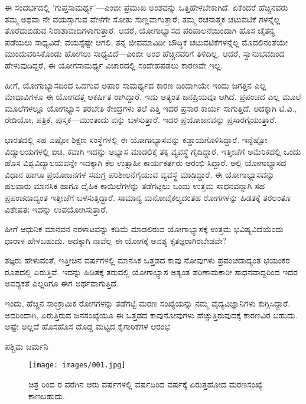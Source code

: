 ಈ ಸಂದರ್ಭದಲ್ಲಿ 'ಗುಪ್ತಸಾಮರ್ಥ್ಯ'—ಎಂಬೀ ಪ್ರಮುಖ ಅಂಶವನ್ನು ಒತ್ತಿಹೇಳಬೇಕಾಗಿದೆ. ಏಕೆಂದರೆ ಹೆಚ್ಚಿನವರು ತಮ್ಮ  ಅಥವಾ  ನೇ ವಯಸ್ಸಾಗುವ ವೇಳೆಗೇ ಸೋತು ಸುಣ್ಣವಾಗುತ್ತಾರೆ; ತಮ್ಮ ರಚನಾತ್ಮಕ ಚಟುವಟಿಕೆ ಗಳನ್ನೆಲ್ಲ ತೊರೆದುಬಿಡುವ ನಿರಾಶಾವಾದಿಗಳಾಗುತ್ತಾರೆ. ಆದರೆ, ಯೋಗಾಭ್ಯಾಸದ ಪರಿಪಾಲನೆಯಿಂದಾಗಿ ಹೊಸ ಚೈತನ್ಯ ಪಡೆಯಲು ಸಾಧ್ಯವಿದೆ; ವಯಸ್ಸೆಷ್ಟೇ ಆಗಲಿ, ತನ್ನ ಜೀವಮಾವಿಡೀ ಬೌದ್ಧಿಕ ಚಟುವಟಿಕೆಗಳನ್ನೆಲ್ಲ ಮೊದಲಿನಂತೆಯೇ ಮುಂದುವರಿಸಿಕೊಂಡು ಹೋಗಲು ಸಾಧ್ಯವಿದೆ—ಎಂಬೀ ಅಂಶ ಹೆಚ್ಚಿನವರಿಗೆ ತಿಳಿದಿಲ್ಲ. ಆದರೆ, ಸ್ವಾನುಭವದಿಂದ ಹೇಳುವುದಿದ್ದರೆ, ಈ ಯೋಗಸಾಮರ್ಥ್ಯ ವಿಚಾರದಲ್ಲಿ ಸಂದೇಹಪಡಲು ಕಾರಣವೇ ಇಲ್ಲ.

ಹೀಗೆ, ಯೋಗಾಭ್ಯಾಸದಿಂದ ಒದಗುವ ಅಪಾರ ಸಾಮರ್ಥ್ಯದ ಕಾರಣ ದಿಂದಾಗಿಯೇ ಇಂದು ಜಗತ್ತಿನ ಎಲ್ಲ ಮೇಧಾವಿಗಳೂ ಈ ಯೋಗದತ್ತ ಆಕರ್ಷಿತ ರಾಗಿದ್ದಾರೆ. ಇದು ಅತ್ಯಂತ ಜನಪ್ರಿಯವೂ ಆಗಿದೆ. ಪ್ರಪಂಚದ ಎಲ್ಲ ಮೂಲೆ ಮೂಲೆಗಳಲ್ಲೂ ಯೋಗಭ್ಯಾಸ ತರಬೇತಿ ಕೇಂದ್ರಗಳು ತಲೆ ಎತ್ತಿ ಇದರ ಪ್ರಸಾರ ಕಾರ್ಯ ಸಾಗುತ್ತಿದೆ. ಅದಕ್ಕಾಗಿ ಟಿ.ವಿ., ರೇಡಿಯೋ, ಪತ್ರಿಕೆ, ಪುಸ್ತಕ—ಮುಂತಾದು ವನ್ನು ಬಳಸುತ್ತಾರೆ. ಇದರ ಪ್ರಯೋಜನವನ್ನು ಪ್ರಸಾರಗೈಯುತ್ತಾರೆ.

ಭಾರತದಲ್ಲಿ ಸಹ ಎಷ್ಟೋ ಶಿಕ್ಷಣ ಸಂಸ್ಥೆಗಳಲ್ಲಿ ಈ ಯೋಗಾಭ್ಯಾಸವನ್ನು ಕಡ್ಡಾಯಗೊಳಿಸಿದ್ದಾರೆ. ಇನ್ನೆಷ್ಟೋ ವಿದ್ಯಾಲಯಗಳಲ್ಲಿ ಐಚಿ, ಕವಾಗಿ ಇದನ್ನು ಅಭ್ಯಾಸ ಮಾಡಲಿಕ್ಕೆ ತಕ್ಕ ವ್ಯವಸ್ಥೆ ಗೈದಿದ್ದಾರೆ. ಇತ್ತೀಚೆಗೆ ಅಮೆರಿಕದಲ್ಲಿ ಒಂದು ಹೊಸ ವಿಶ್ವವಿದ್ಯಾಲಯವನ್ನೇ ಇದಕ್ಕಾಗಿ ಕೆಲ ಉತ್ಸಾಹೀ ಕಾರ್ಯಕರ್ತರು ಆರಂಭಿ ಸಿದ್ದಾರೆ. ಅಲ್ಲಿ ಯೋಗಾಭ್ಯಾಸದ ವಿಧಾನ ಹಾಗೂ ಪ್ರಯೋಜನಗಳ ಸಮಗ್ರ ಪರಿಶೀಲನೆಗೈಯುವ ವ್ಯವಸ್ಥೆ ಮಾಡಿದ್ದಾರೆ. ಈ ಯೋಗಾಭ್ಯಾಸವನ್ನು ಹಲವಾರು ಮಾನಸಿಕ ಹಾಗೂ ದೈಹಿಕ ಕಾಯಿಲೆಗಳನ್ನು ತಡೆಗಟ್ಟಲು ಒಂದು ಉತ್ತಮ ಸಾಧನವನ್ನಾಗಿ ಸಹ ಪ್ರಪಂಚದಾದ್ಯಂತ ಇತ್ತೀಚೆಗೆ ಬಳಸುತ್ತಿದ್ದಾರೆ. ಸಾಮಾನ್ಯ ಮನೋವೈಕಲ್ಯದಂತಹ  ರೋಗಗಳನ್ನು ಹಿಡತಕ್ಕೆ ತರಲಂತೂ ವಿಶೇಷತಃ ಇದನ್ನು ಉಪಯೋಗಿಸುತ್ತಾರೆ.

ಹೀಗೆ ಆಧುನಿಕ ಮಾನವನ ನರಳಾಟವನ್ನು ಕಡಿಮೆ ಮಾಡಲಿರುವ ಯೋಗಾಭ್ಯಾಸಕ್ಕೆ ಉತ್ತಮ ಭವಿಷ್ಯವಿದೆಯೆಂದು ಧಾರಾಳ ಹೇಳಬಹುದು. ಅದಕ್ಕಾಗಿ ನಾವೆಲ್ಲ ಈ ಯೋಗಕ್ಕೆ ಅವಶ್ಯ ಕೃತಜ್ಞರಾಗಿರಬೇಡವೇ?

ತಜ್ಞರು ಹೇಳುವಂತೆ, ಇತ್ತೀಚಿನ ವರ್ಷಗಳಲ್ಲಿ ಮಾನಸಿಕ ಒತ್ತಡದ ಕಾವು ನೋವುಗಳು ಪ್ರಪಂಚದಾದ್ಯಂತ ಭಯಂಕರ ರೂಪದಲ್ಲಿ ಏರುತ್ತಿವೆ. ಇದನ್ನು ಹಿಡಿತಕ್ಕೆ ತರುವಲ್ಲಿ ಯೋಗಾಭ್ಯಾಸ ಅತ್ಯಂತ ಪರಿಣಾಮಕಾರೀ ಸಾಧನವಾದ್ದರಿಂದ ಇದರ ಅವಶ್ಯಕತೆ ಎಲ್ಲರಿಗೂ ಈಗ ಅರ್ಥವಾಗುತ್ತಿದೆ.

ಇಂದು, ಹೆಚ್ಚಿನ ಸಾಂಕ್ರಾಮಿಕ ರೋಗಗಳನ್ನು ತಡೆಗಟ್ಟಿ ಮರಣ ಸಂಖ್ಯೆಯನ್ನು ನಮ್ಮ ವೈದ್ಯವಿಜ್ಞಾನಿಗಳು ಕುಗ್ಗಿಸಿದ್ದಾರೆ. ಅದರಿಂದಾಗಿ, ಏರುತ್ತಿರುವ ಜನ\enginline{}ಸಂಖ್ಯೆಯೂ ಈ ಒತ್ತಡದ ಕಾವುನೋವುಗಳು ಹೆಚ್ಚುತ್ತಿರುವುದಕ್ಕೆ ಕಾರಣವಿರ ಬಹುದು. ಅಷ್ಟೇ ಅಲ್ಲದೆ ಹೊಸಹೊಸ ದೊಡ್ಡ ಮಟ್ಟದ ಕೈಗಾರಿಕೆಗಳ ಆರಂಭ

\begin{center}
ಪಶ್ಚಿಮ ಜರ್ಮನಿ
\end{center}


\begin{figure}
\texttt{[image: images/001.jpg]}
\caption{ಚಿತ್ರ  ರಿಂದ  ರ ವರೆಗಿನ ಆರು ವರ್ಷಗಳಲ್ಲಿ ವರ್ಷದಿಂದ ವರ್ಷಕ್ಕೆ ಏರುತ್ತಹೋದ ಮರಣಸಂಖ್ಯೆ ಕಾಣಬಹುದು.}
\end{figure}

